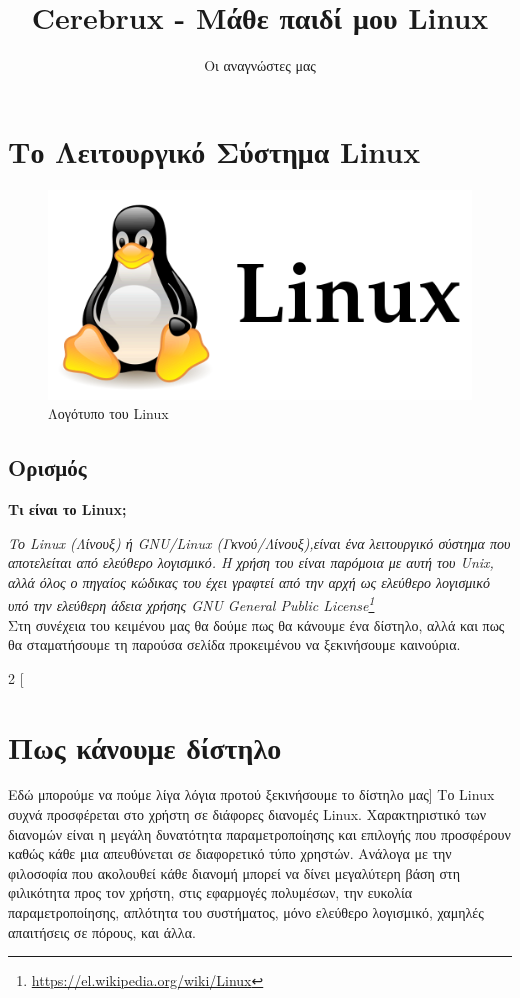 \documentclass[a4paper,titlepage,oneside,12pt]{article}
\title{Cerebrux - Μάθε παιδί μου Linux}
\author{Οι αναγνώστες μας}
\begin{document}
 
 
\section{Το Λειτουργικό Σύστημα Linux} 
 
\begin{figure} [!hbp]
\centering
\includegraphics[width=1\linewidth]{linux-logo.png} 
\caption{Λογότυπο του Linux}
\end{figure}
 
\subsection{Ορισμός}
\textbf{Τι είναι το Linux;}
\medskip
 
\textit{Το Linux (Λίνουξ) ή GNU/Linux (Γκνού/Λίνουξ),είναι ένα λειτουργικό σύστημα που αποτελείται από ελεύθερο λογισμικό. Η χρήση του είναι παρόμοια με αυτή του Unix, αλλά όλος ο πηγαίος κώδικας του έχει γραφτεί από την αρχή ως ελεύθερο λογισμικό υπό την ελεύθερη άδεια χρήσης GNU General Public License\footnote{\url{https://el.wikipedia.org/wiki/Linux}}}\\
Στη συνέχεια του κειμένου μας θα δούμε πως θα κάνουμε ένα δίστηλο, αλλά και πως θα σταματήσουμε τη παρούσα σελίδα προκειμένου να ξεκινήσουμε καινούρια.
\pagebreak
 
\begin{multicols}{2}
[
\section{Πως κάνουμε δίστηλο}
Εδώ μπορούμε να πούμε λίγα λόγια προτού ξεκινήσουμε το δίστηλο μας]
Το Linux συχνά προσφέρεται στο χρήστη σε διάφορες διανομές Linux. Χαρακτηριστικό των διανομών είναι η μεγάλη δυνατότητα παραμετροποίησης και επιλογής που προσφέρουν καθώς κάθε μια απευθύνεται σε διαφορετικό τύπο χρηστών. Ανάλογα με την φιλοσοφία που ακολουθεί κάθε διανομή μπορεί να δίνει μεγαλύτερη βάση στη φιλικότητα προς τον χρήστη, στις εφαρμογές πολυμέσων, την ευκολία παραμετροποίησης, απλότητα του συστήματος, μόνο ελεύθερο λογισμικό, χαμηλές απαιτήσεις σε πόρους, και άλλα.
\end{multicols}
 
\end{document}
